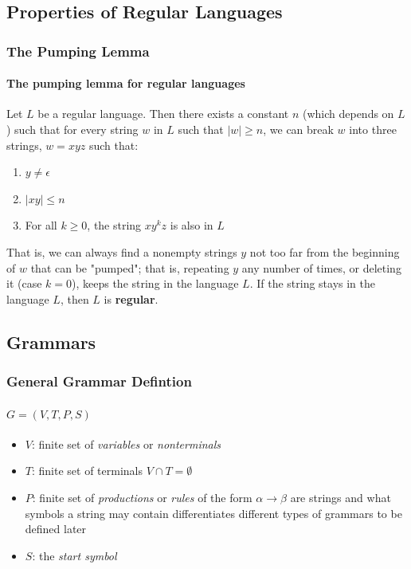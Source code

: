 \documentclass[20pt]{article} %
\begin{document}
\subsection{Properties of Regular Languages}
\subsubsection{The Pumping Lemma}
\paragraph{The pumping lemma for regular languages}  Let $L$ be a regular language. Then there exists a constant $n$ (which depends on $L$) such that for every string $w$ in $L$ such that $|w| \geq n$, we can break $w$ into three strings, $w = xyz$ such that:
\begin{enumerate}
\item $y \neq \epsilon$
\item $|xy| \leq n$
\item For all $k \geq 0$, the string $xy^{k}z$ is also in $L$
\end{enumerate}
That is, we can always find  a nonempty strings $y$ not too far from the beginning of $w$ that can be "pumped"; that is, repeating $y$ any number of times, or deleting it (case $k=0$), keeps the string in the language $L$.  If the string stays in the language $L$, then $L$ is \textbf{regular}.
\newpage
\subsection{Grammars}
\subsubsection{General Grammar Defintion}
\paragraph{$G = (V, T, P, S)$}
\begin{itemize}
\item $V$: finite set of \textit{variables} or \textit{nonterminals}
\item $T$: finite set of terminals $V \cap T = \emptyset$
\item $P$: finite set of \textit{productions} or \textit{rules} of the form $\alpha \rightarrow \beta$ are strings and what symbols a string may contain differentiates different types of grammars to be defined later
\item $S$: the \textit{start symbol}
\end{itemize}
\end{document}
